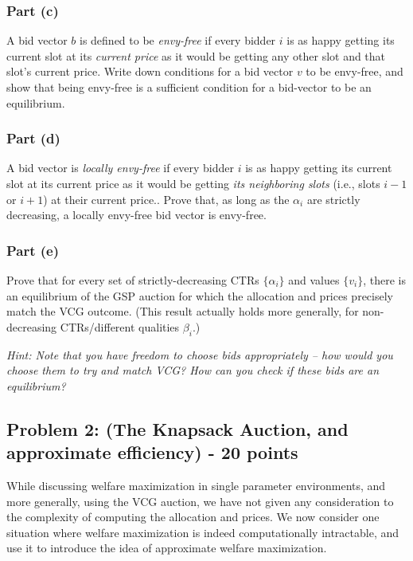 \documentclass[letterpaper,11pt]{article}
\begin{document}
\subsubsection*{Part (c)} 
A bid vector $b$ is defined to be \emph{envy-free} if every bidder $i$ is as happy getting its current slot at its \emph{current price} as it would be getting any other slot and that slot’s current price. Write down conditions for a bid vector $v$ to be envy-free, and show that being envy-free is a sufficient condition for a bid-vector to be an equilibrium. 

\subsubsection*{Part (d)} 
A bid vector is \emph{locally envy-free} if every bidder $i$ is as happy getting its current slot at its current price as it would be getting \emph{its neighboring slots} (i.e., slots $i-1$ or $i+1$) at their current price.. Prove that, as long as the $\alpha_i$ are strictly decreasing, a locally envy-free bid vector is envy-free.

\subsubsection*{Part (e)} 
Prove that for every set of strictly-decreasing CTRs $\{\alpha_i\}$ and values $\{v_i\}$, there is an equilibrium of the GSP auction for which the allocation and prices precisely match the VCG outcome. (This result actually holds more generally, for non-decreasing CTRs/different qualities $\beta_i$.)

\noindent\emph{Hint: Note that you have freedom to choose bids appropriately -- how would you choose them to try and match VCG? How can you check if these bids are an equilibrium?} 


\subsection*{Problem 2: (The Knapsack Auction, and approximate efficiency) - 20 points}

While discussing welfare maximization in single parameter environments, and more generally, using the VCG auction, we have not given any consideration to the complexity of computing the allocation and prices. We now consider one situation where welfare maximization is indeed computationally intractable, and use it to introduce the idea of approximate welfare maximization.
\end{document}
